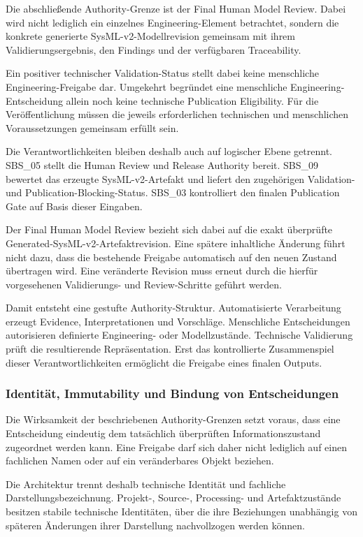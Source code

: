 Die abschließende Authority-Grenze ist der Final Human Model Review. Dabei wird
nicht lediglich ein einzelnes Engineering-Element betrachtet, sondern die
konkrete generierte SysML-v2-Modellrevision gemeinsam mit ihrem
Validierungsergebnis, den Findings und der verfügbaren Traceability.

Ein positiver technischer Validation-Status stellt dabei keine menschliche
Engineering-Freigabe dar. Umgekehrt begründet eine menschliche
Engineering-Entscheidung allein noch keine technische Publication Eligibility.
Für die Veröffentlichung müssen die jeweils erforderlichen technischen und
menschlichen Voraussetzungen gemeinsam erfüllt sein.

Die Verantwortlichkeiten bleiben deshalb auch auf logischer Ebene getrennt.
SBS\_05 stellt die Human Review und Release Authority bereit. SBS\_09 bewertet
das erzeugte SysML-v2-Artefakt und liefert den zugehörigen Validation- und
Publication-Blocking-Status. SBS\_03 kontrolliert den finalen Publication Gate
auf Basis dieser Eingaben.

Der Final Human Model Review bezieht sich dabei auf die exakt überprüfte
Generated-SysML-v2-Artefaktrevision. Eine spätere inhaltliche Änderung führt
nicht dazu, dass die bestehende Freigabe automatisch auf den neuen Zustand
übertragen wird. Eine veränderte Revision muss erneut durch die hierfür
vorgesehenen Validierungs- und Review-Schritte geführt werden.

Damit entsteht eine gestufte Authority-Struktur. Automatisierte Verarbeitung
erzeugt Evidence, Interpretationen und Vorschläge. Menschliche Entscheidungen
autorisieren definierte Engineering- oder Modellzustände. Technische
Validierung prüft die resultierende Repräsentation. Erst das kontrollierte
Zusammenspiel dieser Verantwortlichkeiten ermöglicht die Freigabe eines
finalen Outputs.

\subsubsection{Identität, Immutability und Bindung von Entscheidungen}
\label{sec:identity_immutability}

Die Wirksamkeit der beschriebenen Authority-Grenzen setzt voraus, dass eine
Entscheidung eindeutig dem tatsächlich überprüften Informationszustand
zugeordnet werden kann. Eine Freigabe darf sich daher nicht lediglich auf einen
fachlichen Namen oder auf ein veränderbares Objekt beziehen.

Die Architektur trennt deshalb technische Identität und fachliche
Darstellungsbezeichnung. Projekt-, Source-, Processing- und Artefaktzustände
besitzen stabile technische Identitäten, über die ihre Beziehungen unabhängig
von späteren Änderungen ihrer Darstellung nachvollzogen werden können.

